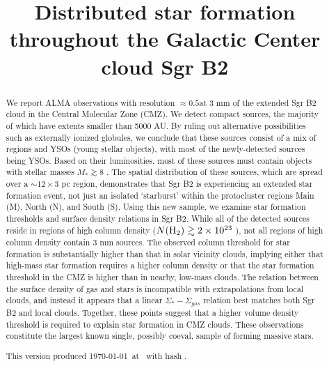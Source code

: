 \documentclass[twocolumn]{aastex61}
\begin{document}
\title{Distributed star formation throughout the Galactic Center cloud Sgr B2}

\begin{abstract}
We report ALMA observations with resolution $\approx0.5$\arcsec at 3 mm  of the
extended Sgr B2 cloud in the Central Molecular Zone (CMZ). We detect \ncores
compact sources, the majority of which have extents smaller than 5000 AU.  By
ruling out alternative possibilities such as externally ionized globules, we
conclude that these sources consist of a mix of \hchii regions and YSOs (young
stellar objects), with most of the newly-detected sources being YSOs.  Based on
their luminosities, most of these sources must contain objects with stellar
masses $M_*\gtrsim8$ \msun.
The spatial distribution of these sources, which are spread over a
$\sim12\times3$ pc region, demonstrates that Sgr B2 is experiencing an extended
star formation event, not just an isolated `starburst' within the protocluster
regions Main (M), North (N), and South (S).  Using this new sample, we examine
star formation thresholds and surface density relations in Sgr B2.  While all
of the detected sources reside in regions of high column density
($N(\textrm{H}_{2})\gtrsim2\times10^{23}$ \persc), not all regions of high column density
contain 3 mm sources.  The observed column threshold for star formation is
substantially higher than that in solar vicinity clouds, implying either that
high-mass star formation requires a higher column density or that the star
formation threshold in the CMZ is higher than in nearby, low-mass clouds.  The
relation between the surface density of gas and stars is incompatible with
extrapolations from local clouds, and instead it appears that a linear
$\Sigma_*-\Sigma_{gas}$ relation best matches both Sgr B2 and local clouds.
Together, these points suggest that a higher volume density threshold is
required to explain star formation in CMZ clouds.
These observations constitute the largest known single, possibly
coeval, sample of forming massive stars.


This version produced \today\ at \currenttime\ with hash \githash.
\end{abstract}
\end{document}
